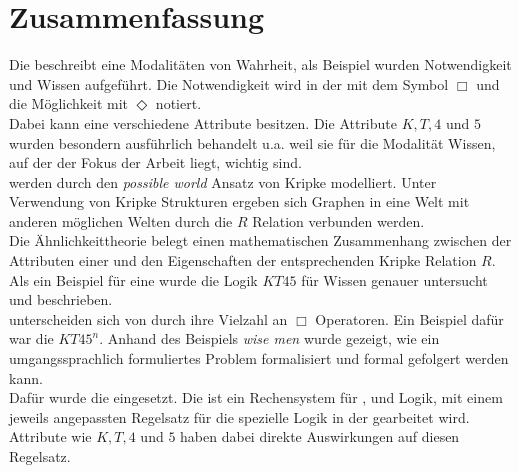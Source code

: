 
\chapter{Zusammenfassung} %
\label{sec:zusammenfassung}

Die \ML beschreibt eine Modalitäten von Wahrheit,
als Beispiel wurden Notwendigkeit und Wissen aufgeführt.
Die Notwendigkeit wird in der \ML mit dem Symbol $\Box$ und die Möglichkeit mit $\Diamond$ notiert.\\
Dabei kann eine \ML verschiedene Attribute besitzen.
Die Attribute $K, T, 4$ und $5$ wurden besondern ausführlich behandelt u.a. weil sie für die Modalität Wissen, auf der der Fokus der Arbeit liegt, wichtig sind.\\
\ML werden durch den \emph{possible world} Ansatz von Kripke modelliert.
Unter Verwendung von Kripke Strukturen ergeben sich Graphen in eine Welt mit anderen möglichen Welten durch die $R$ Relation verbunden werden.\\
Die Ähnlichkeittheorie belegt einen mathematischen Zusammenhang zwischen der Attributen einer \ML und den Eigenschaften der entsprechenden Kripke Relation $R$.\\
Als ein Beispiel für eine \ML wurde die Logik $KT45$ für Wissen genauer untersucht und beschrieben.\\
\MML unterscheiden sich von \ML durch ihre Vielzahl an $\Box$ Operatoren.
Ein Beispiel dafür war die \MML $KT45^n$.
Anhand des Beispiels \emph{wise men} wurde gezeigt, wie ein umgangssprachlich formuliertes Problem formalisiert und formal gefolgert werden kann.\\
Dafür wurde die \ND eingesetzt.
Die \ND ist ein Rechensystem für \AL, \ML und \MML Logik, mit einem jeweils angepassten Regelsatz für die spezielle Logik in der gearbeitet wird.
Attribute wie $K, T, 4$ und $5$ haben dabei direkte Auswirkungen auf diesen Regelsatz.


